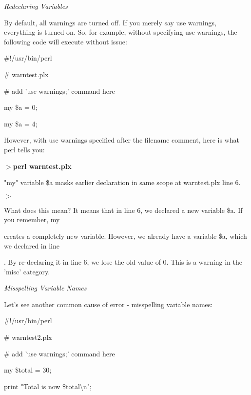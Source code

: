 \documentclass[a4paper,11pt]{book}
\begin{document}
\noindent 

\noindent \textit{Redeclaring Variables}

\noindent By default, all warnings are turned off. If you merely say use warnings, everything is turned on. So, for example, without specifying use warnings, the following code will execute without issue:

\noindent 

\noindent \#!/usr/bin/perl

\noindent \# warntest.plx

\noindent \# add 'use warnings;' command here

\noindent 

\noindent my \$a = 0;

\noindent my \$a = 4;

\noindent 

\noindent However, with use warnings specified after the filename comment, here is what perl tells you:

\noindent 

\noindent $>$\textbf{perl warntest.plx}

\noindent "my" variable \$a masks earlier declaration in same scope at warntest.plx line 6.

\noindent $>$

\noindent 

\noindent What does this mean? It means that in line 6, we declared a new variable \$a. If you remember, my

\noindent creates a completely new variable. However, we already have a variable \$a, which we declared in line

. By re-declaring it in line 6, we lose the old value of 0. This is a warning in the 'misc' category.

\noindent 

\noindent \textit{Misspelling Variable Names}

\noindent Let's see another common cause of error - misspelling variable names:

\noindent 

\noindent \#!/usr/bin/perl

\noindent \# warntest2.plx

\noindent \# add 'use warnings;' command here

\noindent 

\noindent my \$total = 30;

\noindent print "Total is now \$total\textbackslash n";
\end{document}
